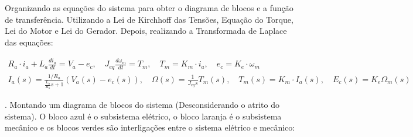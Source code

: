 \documentclass[10pt]{article}
\begin{document}
\quad Organizando as equações do sistema para obter o diagrama de blocos e a função de transferência.
Utilizando a Lei de Kirchhoff das Tensões, Equação do Torque, Lei do Motor e Lei do Gerador. Depois,
realizando a Transformada de Laplace das equações:

\begin{equation}
\begin{aligned}
    R_a \cdot i_a + L_a \frac{di_a}{dt} = V_a - e_c, \quad J_{eq} \frac{d\omega_m}{dt} = T_m, \quad T_m = K_m \cdot i_a, \quad e_c = K_e \cdot \omega_m \\
    I_a(s) = \frac{1/R_a}{\frac{L_a}{R_a}s + 1}(V_a(s) - e_c(s)), \quad \Omega(s) = \frac{1}{J_{eq} s }T_m(s), \quad T_m(s) = K_m \cdot I_a(s), \quad E_c(s) = K_e\Omega_m(s)
\end{aligned}
\end{equation}

. Montando um diagrama de blocos do sistema (Desconsiderando o atrito do sistema).
O bloco azul é o subsistema elétrico, o bloco laranja é o subsistema mecânico e os blocos verdes são interligações entre o sistema elétrico e mecânico:
\end{document}
